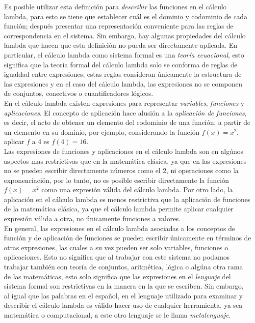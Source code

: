 Es posible utilizar esta definición para \emph{describir} las funciones en el
cálculo lambda, para esto se tiene que establecer cuál es el dominio y codominio
de cada función; después presentar una representación conveniente para las
reglas de correspondencia en el sistema. Sin embargo, hay algunas propiedades
del cálculo lambda que hacen que esta definición no pueda ser directamente
aplicada. En particular, el cálculo lambda como sistema formal es una
\emph{teoría ecuacional}, esto significa que la teoría formal del cálculo lambda
solo se conforma de reglas de igualdad entre expresiones, estas reglas
consideran únicamente la estructura de las expresiones y en el caso del cálculo
lambda, las expresiones no se componen de conjuntos, conectivos o
cuantificadores lógicos.\\

En el cálculo lambda existen expresiones para representar \emph{variables},
\emph{funciones} y \emph{aplicaciones}. El concepto de aplicación hace alusión a
la \emph{aplicación de funciones}, es decir, el acto de obtener un elemento del
codominio de una función, a partir de un elemento en su dominio, por ejemplo,
considerando la función \(f(x)=x^2\), aplicar \(f\) a 4 es \(f(4)=16\).\\

Las expresiones de funciones y aplicaciones en el cálculo lambda son en algúnos
aspectos mas restrictivas que en la matemática clásica, ya que en las
expresiones no se pueden escribir directamente números como el 2, ni operaciones
como la exponenciación, por lo tanto, no es posible escribir directamente la
función \(f(x)=x^2\) como una expresión válida del cálculo lambda. Por otro
lado, la aplicación en el cálculo lambda es menos restrictiva que la aplicación
de funciones de la matemática clásica, ya que el cálculo lambda permite aplicar
cualquier expresión válida a otra, no únicamente funciones a valores.\\

En general, las expresiones en el cálculo lambda asociadas a los conceptos de
función y de aplicación de funciones se pueden escribir únicamente en términos
de otras expresiones, las cuales a su vez pueden ser solo variables, funciones o
aplicaciones. Esto no significa que al trabajar con este sistema no podamos
trabajar también con teoría de conjuntos, aritmética, lógica o algúna otra rama
de las matemáticas, esto solo significa que las expresiones en el
\emph{lenguaje} del sistema formal son restrictivas en la manera en la que se
escriben. Sin embargo, al igual que las palabras en el español, en el lenguaje
utilizado para examinar y describir el cálculo lambda es válido hacer uso de
cualquier herramienta, ya sea matemática o computacional, a este otro lenguaje
se le llama \emph{metalenguaje}.\\

